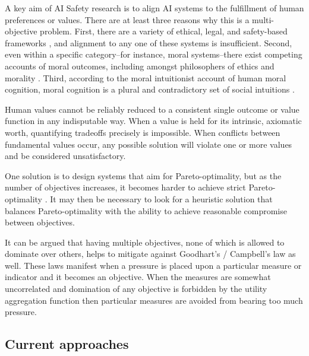 

A key aim of AI Safety research is to align AI systems to the fulfillment of human preferences \cite{Bostrom2014, russell2019human} or values. There are at least three reasons why this is a multi-objective problem. First, there are a variety of ethical, legal, and safety-based frameworks \cite{vamplew_human-aligned_2018}, and alignment to any one of these systems is insufficient. Second, even within a specific category--for instance, moral systems--there exist competing accounts of moral outcomes, including amongst philosophers of ethics and morality \cite{bogosian_implementation_2017}. Third, according to the moral intuitionist account of human moral cognition, moral cognition is a plural and contradictory set of social intuitions \cite{haidt2001emotional,sotala2016defining}.

Human values cannot be reliably reduced to a consistent single outcome or value function in any indisputable way. When a value is held for its intrinsic, axiomatic worth, quantifying tradeoffs precisely is impossible. When conflicts between fundamental values occur, any possible solution will violate one or more values and be considered unsatisfactory.  

One solution is to design systems that aim for Pareto-optimality, but as the number of objectives increases, it becomes harder to achieve strict Pareto-optimality \cite{rolf_need_2020}. It may then be necessary to look for a heuristic solution that balances Pareto-optimality with the ability to achieve reasonable compromise between objectives. %

It can be argued that having multiple objectives, none of which is allowed to dominate over others, helps to mitigate against Goodhart's / Campbell's law as well. These laws manifest when a pressure is placed upon a particular measure or indicator and it becomes an objective. When the measures are somewhat uncorrelated and domination of any objective is forbidden by the utility aggregation function then particular measures are avoided from bearing too much pressure.

\subsection{Current approaches}

